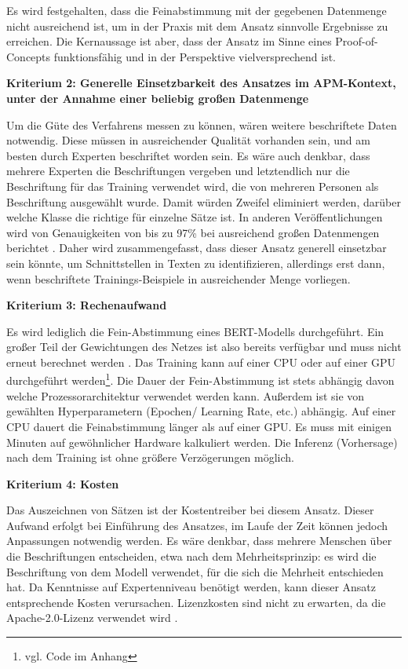 Es wird festgehalten, dass die Feinabstimmung mit der gegebenen Datenmenge nicht ausreichend ist, um in der Praxis mit dem Ansatz sinnvolle Ergebnisse zu erreichen. Die Kernaussage ist aber, dass der Ansatz im Sinne eines Proof-of-Concepts funktionsfähig und in der Perspektive vielversprechend ist.

{\bf Kriterium 2: Generelle Einsetzbarkeit des Ansatzes im APM-Kontext, unter der Annahme einer beliebig großen Datenmenge}

Um die Güte des Verfahrens messen zu können, wären weitere beschriftete Daten notwendig. Diese müssen in ausreichender Qualität vorhanden sein, und am besten durch Experten beschriftet worden sein. Es wäre auch denkbar, dass mehrere Experten die Beschriftungen vergeben und letztendlich nur die Beschriftung für das Training verwendet wird, die von mehreren Personen als Beschriftung ausgewählt wurde. Damit würden Zweifel eliminiert werden, darüber welche Klasse die richtige für einzelne Sätze ist. In anderen Veröffentlichungen wird von Genauigkeiten von bis zu 97\% bei ausreichend großen Datenmengen berichtet \cite{Tang}. Daher wird zusammengefasst, dass dieser Ansatz generell einsetzbar sein könnte, um Schnittstellen in Texten zu identifizieren, allerdings erst dann, wenn beschriftete Trainings-Beispiele in ausreichender Menge vorliegen.

{\bf Kriterium 3: Rechenaufwand}

Es wird lediglich die Fein-Abstimmung eines BERT-Modells durchgeführt. Ein großer Teil der Gewichtungen des Netzes ist also bereits verfügbar und muss nicht erneut berechnet werden \cite{bert}.
Das Training kann auf einer CPU oder auf einer GPU durchgeführt werden\footnote{vgl. Code im Anhang}. Die Dauer der Fein-Abstimmung ist stets abhängig davon welche Prozessorarchitektur verwendet werden kann. Außerdem ist sie von gewählten Hyperparametern (Epochen/ Learning Rate, etc.) abhängig. Auf einer CPU dauert die Feinabstimmung länger als auf einer GPU. Es muss mit einigen Minuten auf gewöhnlicher Hardware kalkuliert werden. Die Inferenz (Vorhersage) nach dem Training ist ohne größere Verzögerungen möglich.

{\bf Kriterium 4: Kosten}

Das Auszeichnen von Sätzen ist der Kostentreiber bei diesem Ansatz. Dieser Aufwand erfolgt bei Einführung des Ansatzes, im Laufe der Zeit können jedoch Anpassungen notwendig werden. Es wäre denkbar, dass mehrere Menschen über die Beschriftungen entscheiden, etwa nach dem Mehrheitsprinzip: es wird die Beschriftung von dem Modell verwendet, für die sich die Mehrheit entschieden hat. Da Kenntnisse auf Expertenniveau benötigt werden, kann dieser Ansatz entsprechende Kosten verursachen. Lizenzkosten sind nicht zu erwarten, da die Apache-2.0-Lizenz verwendet wird \cite{bert}.

